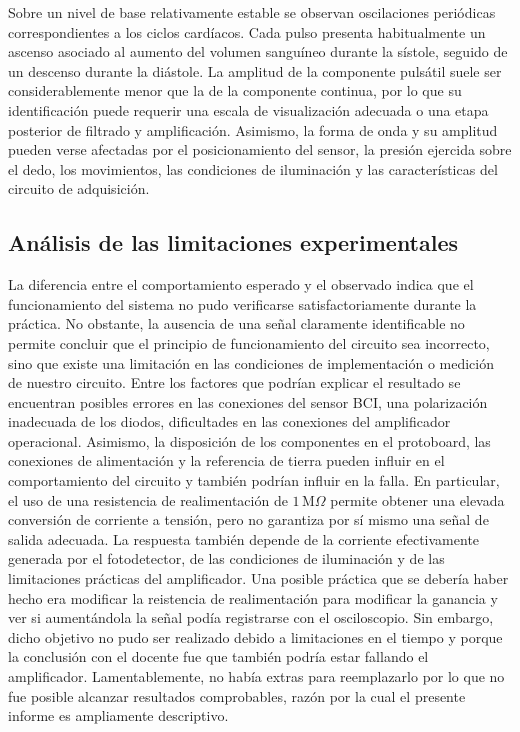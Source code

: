 Sobre un nivel de base relativamente estable se observan oscilaciones periódicas correspondientes a los ciclos cardíacos. Cada pulso presenta habitualmente un ascenso asociado al aumento del volumen sanguíneo durante la sístole, seguido de un descenso durante la diástole.
La amplitud de la componente pulsátil suele ser considerablemente menor que la de la componente continua, por lo que su identificación puede requerir una escala de visualización adecuada o una etapa posterior de filtrado y amplificación. Asimismo, la forma de onda y su amplitud pueden verse afectadas por el posicionamiento del sensor, la presión ejercida sobre el dedo, los movimientos, las condiciones de iluminación y las características del circuito de adquisición.

\subsection{Análisis de las limitaciones experimentales}
La diferencia entre el comportamiento esperado y el observado indica que el funcionamiento del sistema no pudo verificarse satisfactoriamente durante la práctica. No obstante, la ausencia de una señal claramente identificable no permite concluir que el principio de funcionamiento del circuito sea incorrecto, sino que existe una limitación en las condiciones de implementación o medición de nuestro circuito.
Entre los factores que podrían explicar el resultado se encuentran posibles errores en las conexiones del sensor BCI, una polarización inadecuada de los diodos, dificultades en las conexiones del amplificador operacional. Asimismo, la disposición de los componentes en el protoboard, las conexiones de alimentación y la referencia de tierra pueden influir en el comportamiento del circuito y también podrían influir en la falla.
En particular, el uso de una resistencia de realimentación de \(1\,\text{M}\Omega\) permite obtener una elevada conversión de corriente a tensión, pero no garantiza por sí mismo una señal de salida adecuada. La respuesta también depende de la corriente efectivamente generada por el fotodetector, de las condiciones de iluminación y de las limitaciones prácticas del amplificador. Una posible práctica que se debería haber hecho era modificar la
reistencia de realimentación para modificar la ganancia y ver si aumentándola la señal podía registrarse con el osciloscopio. Sin embargo, dicho objetivo no pudo ser realizado debido a limitaciones en el tiempo y porque la conclusión con el docente fue que también podría estar fallando el amplificador. Lamentablemente, no había extras para reemplazarlo por lo que no fue posible alcanzar resultados comprobables, razón por la cual el presente informe
es ampliamente descriptivo.